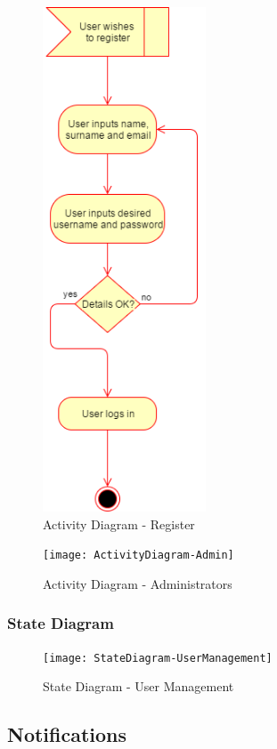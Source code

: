 \documentclass{article}
\begin{document}
		\begin{figure}[H]
  			\caption{Activity Diagram - Register}
  			\centering
    			\includegraphics[height=15cm]{ActivityDiagram-Register}
		\end{figure}

		\begin{figure}[H]
  			\caption{Activity Diagram - Administrators}
  			\centering
    			\texttt{[image: ActivityDiagram-Admin]}
		\end{figure}

		\newpage
        \subsubsection{State Diagram}
        	\begin{figure}[H]
  			\caption{State Diagram - User Management}
  			\centering
    			\texttt{[image: StateDiagram-UserManagement]}
		\end{figure}
	\newpage
    \subsection{Notifications}
\end{document}
